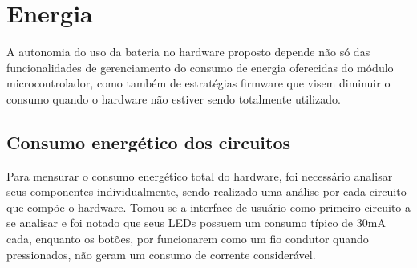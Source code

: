 	\begin{table}[!h]
	\captionsetup{width=10cm}%
	\end{table}


















\section{Energia}\label{sec:energia}

A autonomia do uso da bateria no hardware proposto depende não só das funcionalidades de gerenciamento do consumo de energia oferecidas do módulo microcontrolador, como também de estratégias firmware que visem diminuir o consumo quando o hardware não estiver sendo totalmente utilizado. 

\subsection{Consumo energético dos circuitos}\label{subsec:consumo_circuitos}

Para mensurar o consumo energético total do hardware, foi necessário analisar seus componentes individualmente, sendo realizado uma análise por cada circuito que compõe o hardware. Tomou-se a interface de usuário como primeiro circuito a se analisar e foi notado que seus LEDs possuem um consumo típico de 30mA cada, enquanto os botões, por funcionarem como um fio condutor quando pressionados, não geram um consumo de corrente considerável. 

